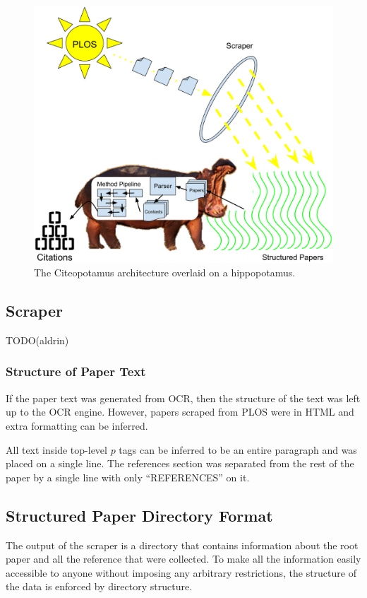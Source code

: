 \documentclass[10pt, conference, compsocconf]{IEEEtran}
\begin{document}
\begin{figure}[ht]
   \includegraphics[width=\textwidth]{images/arch.eps}
        \caption{The Citeopotamus architecture overlaid on a hippopotamus.}
        \label{fig:arch}
\end{figure}

\subsection{Scraper}
TODO(aldrin)

\subsubsection{Structure of Paper Text}\label{sec:text_structure}
If the paper text was generated from OCR, then the structure of the text was
left up to the OCR engine.  However, papers scraped from PLOS were in HTML and
extra formatting can be inferred.

All text inside top-level $p$ tags can be inferred to be an entire paragraph
and was placed on a single line.  The references section was separated from the
rest of the paper by a single line with only ``REFERENCES'' on it.

\subsection{Structured Paper Directory Format}\label{sec:dir_structure}
The output of the scraper is a directory that contains information about the
root paper and all the reference that were collected.  To make all the
information easily accessible to anyone without imposing any arbitrary
restrictions, the structure of the data is enforced by directory structure.
\end{document}
